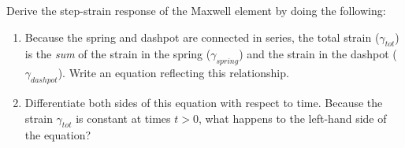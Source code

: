 \begin{activity}
\begin{exercises}
\begin{enumerate}
			\end{enumerate}
			
		
		
			
		\exercise \label{\labelbase:exc:maxwell} Derive the step-strain response of the Maxwell element by doing the following:
			
			\begin{enumerate}
					
				\item Because the spring and dashpot are connected in series, the total strain ($\gamma_{tot}$) is the \emph{sum} of the strain in the spring ($\gamma_{spring}$) and the strain in the dashpot ($\gamma_{dashpot}$).  Write an equation reflecting this relationship.
				
					\begin{solution}\end{solution}
					
				\item Differentiate both sides of this equation with respect to time.  Because the strain $\gamma_{tot}$ is constant at times $t>0$, what happens to the left-hand side of the equation?
				
					\begin{solution}\end{solution}
				

\end{enumerate}
\end{exercises}
\end{activity}
